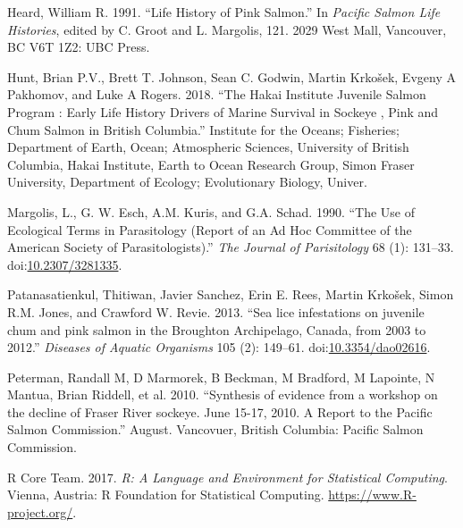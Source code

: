 \documentclass[fleqn,10pt]{wlpeerj} %
\begin{document}
\hypertarget{ref-Heard1991}{}
Heard, William R. 1991. ``Life History of Pink Salmon.'' In
\emph{Pacific Salmon Life Histories}, edited by C. Groot and L.
Margolis, 121. 2029 West Mall, Vancouver, BC V6T 1Z2: UBC Press.

\hypertarget{ref-Hunt2018}{}
Hunt, Brian P.V., Brett T. Johnson, Sean C. Godwin, Martin Krkošek,
Evgeny A Pakhomov, and Luke A Rogers. 2018. ``The Hakai Institute
Juvenile Salmon Program : Early Life History Drivers of Marine Survival
in Sockeye , Pink and Chum Salmon in British Columbia.'' Institute for
the Oceans; Fisheries; Department of Earth, Ocean; Atmospheric Sciences,
University of British Columbia, Hakai Institute, Earth to Ocean Research
Group, Simon Fraser University, Department of Ecology; Evolutionary
Biology, Univer.

\hypertarget{ref-Margolis1990}{}
Margolis, L., G. W. Esch, A.M. Kuris, and G.A. Schad. 1990. ``The Use of
Ecological Terms in Parasitology (Report of an Ad Hoc Committee of the
American Society of Parasitologists).'' \emph{The Journal of
Parisitology} 68 (1): 131--33.
doi:\href{https://doi.org/10.2307/3281335}{10.2307/3281335}.

\hypertarget{ref-Patanasatienkul2013}{}
Patanasatienkul, Thitiwan, Javier Sanchez, Erin E. Rees, Martin Krkošek,
Simon R.M. Jones, and Crawford W. Revie. 2013. ``Sea lice infestations
on juvenile chum and pink salmon in the Broughton Archipelago, Canada,
from 2003 to 2012.'' \emph{Diseases of Aquatic Organisms} 105 (2):
149--61. doi:\href{https://doi.org/10.3354/dao02616}{10.3354/dao02616}.

\hypertarget{ref-Peterman2010}{}
Peterman, Randall M, D Marmorek, B Beckman, M Bradford, M Lapointe, N
Mantua, Brian Riddell, et al. 2010. ``Synthesis of evidence from a
workshop on the decline of Fraser River sockeye. June 15-17, 2010. A
Report to the Pacific Salmon Commission.'' August. Vancovuer, British
Columbia: Pacific Salmon Commission.

\hypertarget{ref-R}{}
R Core Team. 2017. \emph{R: A Language and Environment for Statistical
Computing}. Vienna, Austria: R Foundation for Statistical Computing.
\url{https://www.R-project.org/}.
\end{document}
